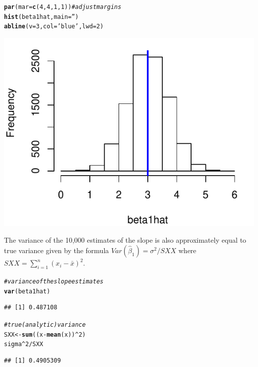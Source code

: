 \documentclass[11pt]{article}\usepackage[]{graphicx}\usepackage[]{color}
\makeatletter
\def\maxwidth{ %
  \ifdim\Gin@nat@width>\linewidth
    \linewidth
  \else
    \Gin@nat@width
  \fi
}
\newcommand{\hlnum}[1]{\textcolor[rgb]{0.686,0.059,0.569}{#1}}%
\newcommand{\hlstr}[1]{\textcolor[rgb]{0.192,0.494,0.8}{#1}}%
\newcommand{\hlcom}[1]{\textcolor[rgb]{0.678,0.584,0.686}{\textit{#1}}}%
\newcommand{\hlopt}[1]{\textcolor[rgb]{0,0,0}{#1}}%
\newcommand{\hlstd}[1]{\textcolor[rgb]{0.345,0.345,0.345}{#1}}%
\newcommand{\hlkwb}[1]{\textcolor[rgb]{0.69,0.353,0.396}{#1}}%
\newcommand{\hlkwc}[1]{\textcolor[rgb]{0.333,0.667,0.333}{#1}}%
\newcommand{\hlkwd}[1]{\textcolor[rgb]{0.737,0.353,0.396}{\textbf{#1}}}%
\newenvironment{kframe}{%
 \def\at@end@of@kframe{}%
 \ifinner\ifhmode%
  \def\at@end@of@kframe{\end{minipage}}%
  \begin{minipage}{\columnwidth}%
 \fi\fi%
 \def\FrameCommand##1{\hskip\@totalleftmargin \hskip-\fboxsep
 \colorbox{shadecolor}{##1}\hskip-\fboxsep
     \hskip-\linewidth \hskip-\@totalleftmargin \hskip\columnwidth}%
 \MakeFramed {\advance\hsize-\width
   \@totalleftmargin\z@ \linewidth\hsize
   \@setminipage}}%
 {\par\unskip\endMakeFramed%
 \at@end@of@kframe}
\newenvironment{knitrout}{}{} %
\makeatother
\begin{document}
\begin{knitrout}
\color{fgcolor}\begin{kframe}
\begin{alltt}
\hlkwd{par}\hlstd{(}\hlkwc{mar}\hlstd{=}\hlkwd{c}\hlstd{(}\hlnum{4}\hlstd{,}\hlnum{4}\hlstd{,}\hlnum{1}\hlstd{,}\hlnum{1}\hlstd{))} \hlcom{#adjust margins}
\hlkwd{hist}\hlstd{(beta1hat,} \hlkwc{main}\hlstd{=}\hlstr{''}\hlstd{)}
\hlkwd{abline}\hlstd{(}\hlkwc{v}\hlstd{=}\hlnum{3}\hlstd{,} \hlkwc{col}\hlstd{=}\hlstr{'blue'}\hlstd{,} \hlkwc{lwd}\hlstd{=}\hlnum{2}\hlstd{)}
\end{alltt}
\end{kframe}
\includegraphics[width=\maxwidth]{figure/unnamed-chunk-5-1} 

\end{knitrout}


\clearpage
The variance of the 10,000 estimates of the slope is also approximately equal to true variance given by the formula $Var(\hat{\beta}_1) = \sigma^2 / SXX$ where $SXX = \sum_{i=1}^n (x_i - \bar{x})^2$.
\begin{knitrout}
\color{fgcolor}\begin{kframe}
\begin{alltt}
\hlcom{# variance of the slope estimates}
\hlkwd{var}\hlstd{(beta1hat)}
\end{alltt}
\begin{verbatim}
## [1] 0.487108
\end{verbatim}
\begin{alltt}
\hlcom{# true (analytic) variance}
\hlstd{SXX} \hlkwb{<-} \hlkwd{sum}\hlstd{((x} \hlopt{-} \hlkwd{mean}\hlstd{(x))}\hlopt{^}\hlnum{2}\hlstd{)}
\hlstd{sigma}\hlopt{^}\hlnum{2} \hlopt{/} \hlstd{SXX}
\end{alltt}
\begin{verbatim}
## [1] 0.4905309
\end{verbatim}
\end{kframe}
\end{knitrout}
\end{document}
